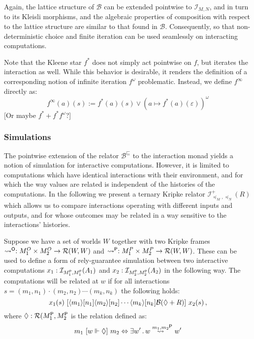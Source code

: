 Again,
the lattice structure of $\mathcal{B}$
can be extended pointwise to $\mathcal{I}_{M,N}$,
and in turn to its Kleisli morphisms,
and the algebraic properties of composition
with respect to the lattice structure
are similar to that found in $\mathcal{B}$.
Consequently,
so that non-deterministic choice and finite iteration
can be used seamlessly on interacting computations.

Note that the Kleene star $f^*$
does not simply act pointwise on $f$,
but iterates the interaction as well.
While this behavior is desirable,
it renders the definition of a corresponding notion of
infinite iteration $f^\omega$ problematic.
Instead,
we define $f^\infty$ directly as:
\[
    f^\infty(a)(s) := f^*(a)(s) \vee (a \mapsto f^*(a)(\varepsilon))^\omega
\]
[Or maybe $f^* + f^*f^\omega$?]

\subsubsection{Simulations}

The pointwise extension of the relator $\mathcal{B}^\sqsubseteq$
to the interaction monad
yields a notion of simulation for interactive computations.
However,
it is limited to computations which have identical interactions
with their environment,
and for which the way values are related
is independent of the histories of the computations.
In the following
we present a ternary Kripke relator $\mathcal{I}^+_{\preceq_M,\preceq_N}(R)$
which allows us to compare interactions
operating with different inputs and outputs,
and for whose outcomes may be related in a way
sensitive to the interactions' histories.

Suppose we have a set of worlds $W$
together with two Kripke frames
$\leadsto^{ \mathsf{O} } : M_1^O \times M_2^O \rightarrow \mathcal{R}(W, W)$ and
$\leadsto^{ \mathsf{P} } : M_1^P \times M_2^P \rightarrow \mathcal{R}(W, W)$.
These can be used to define a form of rely-guarantee simulation
between two interactive computations
$x_1 : \mathcal{I}_{M_1^{ \mathsf{P} },M_1^{ \mathsf{P} }}(A_1)$ and
$x_2 : \mathcal{I}_{M_2^{ \mathsf{P} },M_2^{ \mathsf{P} }}(A_2)$
in the following way.
The computations will be related at $w$
if for all interactions $s = (m_1, n_1) \cdot (m_2, n_2) \cdots (m_k, n_k)$
the following holds:
\[
    x_1(s)
    \ [{\langle m_1 \rangle [n_1]
         \langle m_2 \rangle [n_2] \cdots
         \langle m_k \rangle [n_k]
         \mathcal{B}(\Diamond + R)}]\ 
    x_2(s) \,,
\]
where $\Diamond : \mathcal{R}(M_1^{ \mathsf{P} }, M_2^{ \mathsf{P} }$
is the relation defined as:
\[
    m_1 \ [{w \Vdash \Diamond}]\  m_2 \Leftrightarrow
      \exists w' \,.\, w \stackrel{m_1,m_2}{\leadsto}^{ \mathsf{P} } w'
\]

